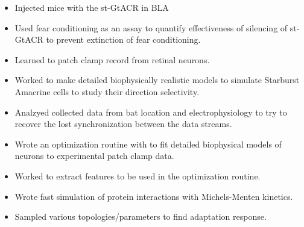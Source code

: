 \documentclass[10pt,a4paper]{altacv}
\begin{document}
\begin{itemize}
\item Injected mice with the st-GtACR in BLA
\item Used fear conditioning as an assay to quantify effectiveness of silencing of st-GtACR to prevent extinction of fear conditioning.
\end{itemize}
\divider


\begin{itemize}
\item Learned to patch clamp record from retinal neurons.
\item Worked to make detailed biophysically realistic models to simulate Starburst Amacrine cells to study their direction selectivity.
\end{itemize}
\divider


\begin{itemize}
\item Analzyed collected data from bat location and electrophysiology to try to recover the lost synchronization between the data streams.
\end{itemize}
\divider



\begin{itemize}
\item Wrote an optimization routine with to fit detailed biophysical models of neurons to experimental patch clamp data.
\item Worked to extract features to be used in the optimization routine.
\end{itemize}

\vspace{2em}



\begin{itemize}
\item Wrote fast simulation of protein interactions with Michels-Menten kinetics.
\item Sampled various topologies/parameters to find adaptation response. 
\end{itemize}
\end{document}
